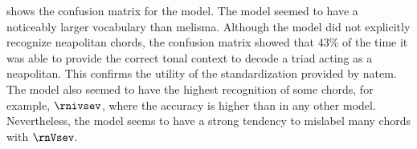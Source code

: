 
 shows the confusion
matrix for the \textcite{chen2021attend} model. The model
seemed to have a noticeably larger vocabulary than
\gls{melisma}. Although the model did not explicitly
recognize \gls{neapolitan} chords, the confusion matrix
showed that 43\% of the time it was able to provide the
correct tonal context to decode a triad acting as a
\gls{neapolitan}. This confirms the utility of the
standardization provided by \gls{natem}. The
\textcite{chen2021attend} model also seemed to have the
highest recognition of some chords, for example, $\rnivsev$,
where the accuracy is higher than in any other model.
Nevertheless, the model seems to have a strong tendency to
mislabel many chords with $\rnVsev$.

